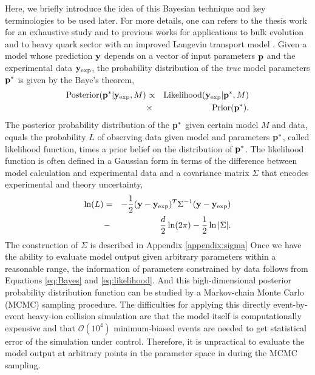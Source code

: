 \documentclass[aps, prc, reprint, amsmath, groupedaddress, nofootinbib]{revtex4-1}
\begin{document}
Here, we briefly introduce the idea of this Bayesian technique and key terminologies to be used later.
For more details, one can refers to the thesis work \cite{Bernhard:2018hnz} for an exhaustive study and to previous works for applications to bulk evolution \cite{Bernhard:2015hxa,Bernhard:2016tnd} and to heavy quark sector with an improved Langevin transport model \cite{Xu:2017obm}.
Given a model whose prediction ${\bf y}$ depends on a vector of input parameters ${\bf p}$ and the experimental data ${\bf y}_\textrm{exp}$, 
the probability distribution of the {\it true} model parameters ${\bf p^*}$ is given by the Baye's theorem, 
\begin{eqnarray}\label{eq:Bayes}
\textrm{Posterior}({\bf p^*}|{\bf y}_\textrm{exp}, M) &\propto& \textrm{Likelihood}({\bf y}_\textrm{exp}|{\bf p^*}, M) \nonumber \\ &\times& \textrm{Prior}({\bf p^*}).
\end{eqnarray}
The posterior probability distribution of the ${\bf p^*}$ given certain model $M$ and data, equals the probability $L$ of observing data given model and parameters ${\bf p^*}$, called likelihood function, times a prior belief on the distribution of ${\bf p^*}$.
The likelihood function is often defined in a Gaussian form in terms of the difference between model calculation and experimental data and a covariance matrix $\Sigma$ that encodes experimental and theory uncertainty,
\begin{eqnarray}\label{eq:likelihood}
\ln(L) &=& -\frac{1}{2}({\bf y}-{\bf y}_{\textrm{exp}})^T\Sigma^{-1} ({\bf y}-{\bf y}_{\textrm{exp}})\nonumber\\ 
		&-&\frac{d}{2}\ln(2\pi)-\frac{1}{2}\ln|\Sigma|.
\end{eqnarray}
The construction of $\Sigma$ is described in Appendix \ref{appendix:sigma}
Once we have the ability to evaluate model output given arbitrary parameters within a reasonable range, the information of parameters constrained by data follows from Equations \ref{eq:Bayes} and \ref{eq:likelihood}.
And this high-dimensional posterior probability distribution function can be studied by a Markov-chain Monte Carlo (MCMC) sampling procedure.
The difficulties for applying this directly event-by-event heavy-ion collision simulation are that the model itself is computationally expensive and that $\mathcal{O}(10^4)$ minimum-biased events are needed to get statistical error of the simulation under control.
Therefore, it is unpractical to evaluate the model output at arbitrary points in the parameter space in during the MCMC sampling.
\end{document}
